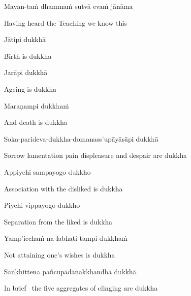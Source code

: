 Mayan-taṁ dhammaṁ sutvā evaṁ jānāma

\begin{english}
  Having heard the Teaching we know this
\end{english}

Jātipi dukkhā

\begin{english}
  Birth is dukkha
\end{english}

Jarāpi dukkhā

\begin{english}
  Ageing is dukkha
\end{english}

Maraṇampi dukkhaṁ

\begin{english}
  And death is dukkha
\end{english}

Soka-parideva-dukkha-domanass'upāyāsāpi dukkhā

\begin{english}
  Sorrow lamentation pain displeasure\hyperlink{endnote14-appendix}{\hypertarget{endnote14-body}{}}
  and despair are dukkha
\end{english}

Appiyehi sampayogo dukkho

\begin{english}
  Association with the disliked is dukkha
\end{english}

Piyehi vippayogo dukkho

\begin{english}
  Separation from the liked is dukkha
\end{english}

Yamp'icchaṁ na labhati tampi dukkhaṁ

\begin{english}
  Not attaining one's wishes is dukkha
\end{english}

Saṅkhittena pañcupādānakkhandhā dukkhā

\begin{english}
  In brief \breathmark\ the five aggregates of clinging are dukkha\hyperlink{endnote15-appendix}{\hypertarget{endnote15-body}{}}
\end{english}

